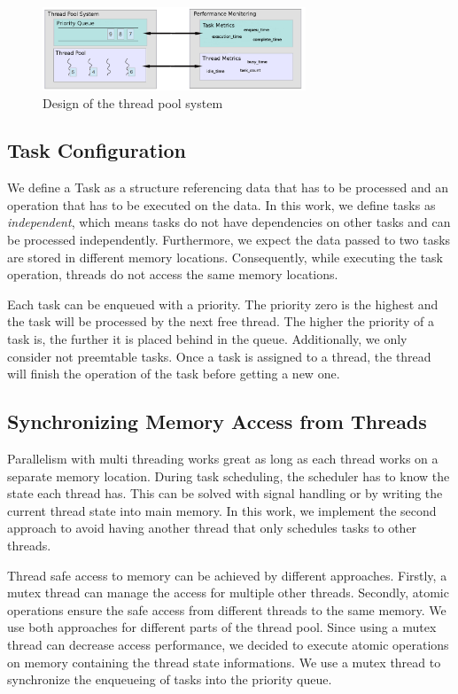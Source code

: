 \documentclass[conference]{IEEEtran}
\begin{document}
\begin{figure}[htbp]
	\centering \includegraphics[width=0.7\textwidth]{img/pool_structure.png}
	\caption{Design of the thread pool system}
	\label{fig0}
\end{figure}

\subsection{Task Configuration}
We define a Task as a structure referencing data that has to be processed and an operation that has to be executed on the data. In this work, we define tasks as \emph{independent}, which means tasks do not have dependencies on other tasks and can be processed independently. Furthermore, we expect the data passed to two tasks are stored in different memory locations. Consequently, while executing the task operation, threads do not access the same memory locations.

Each task can be enqueued with a priority. The priority zero is the highest and the task will be processed by the next free thread. The higher the priority of a task is, the further it is placed behind in the queue. Additionally, we only consider not preemtable tasks. Once a task is assigned to a thread, the thread will finish the operation of the task before getting a new one.

\subsection{Synchronizing Memory Access from Threads}
Parallelism with multi threading works great as long as each thread works on a separate memory location. During task scheduling, the scheduler has to know the state each thread has. This can be solved with signal handling or by writing the current thread state into main memory. In this work, we implement the second approach to avoid having another thread that only schedules tasks to other threads.

Thread safe access to memory can be achieved by different approaches. Firstly, a mutex thread can manage the access for multiple other threads. Secondly, atomic operations ensure the safe access from different threads to the same memory. We use both approaches for different parts of the thread pool. Since using a mutex thread can decrease access performance, we decided to execute atomic operations on memory containing the thread state informations. We use a mutex thread to synchronize the enqueueing of tasks into the priority queue.
\end{document}
